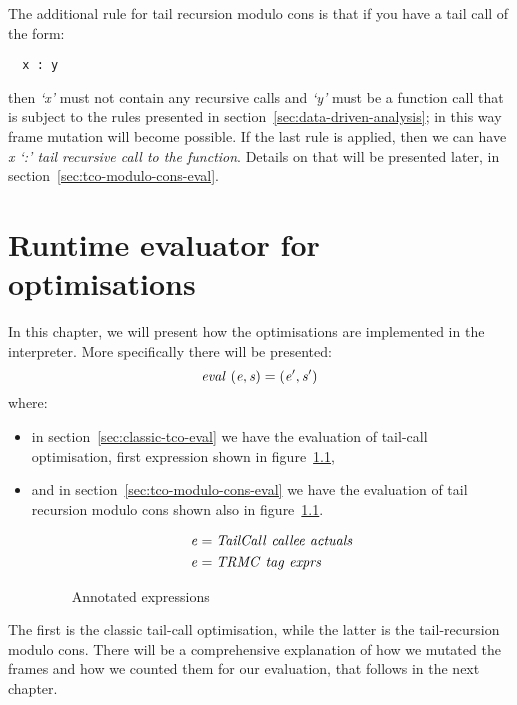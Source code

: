 \documentclass[diploma]{softlab-thesis}
\begin{document}
The additional rule for tail recursion modulo cons is that if you have a tail call of the form:
\begin{verbatim}
  x : y
\end{verbatim}
then \textit{`x'} must not contain any recursive calls and \textit{`y'} must be a function call that is subject to the 
rules presented in section~\ref{sec:data-driven-analysis}; in this way frame mutation will become possible. If the last rule is applied, 
then we can have \textit{x `:' tail recursive call to the function}. Details on that will be presented later, in section~\ref{sec:tco-modulo-cons-eval}.



\chapter {Runtime evaluator for optimisations}
\label{ch:evaluator}

In this chapter, we will present how the optimisations are implemented in the interpreter.
More specifically there will be presented:
\[ \mathit{eval \hfill\ (e, s) = (e', s')} \]
where:
\begin{itemize}
\item in section~\ref{sec:classic-tco-eval} we have the evaluation of tail-call optimisation, first expression 
      shown in figure~\ref{fig:annos},
\item and in section~\ref{sec:tco-modulo-cons-eval} we have the evaluation of tail recursion modulo cons shown
      also in figure~\ref{fig:annos}.
\begin{figure}[h]
  \begin{align*}
    & \mathit{e = TailCall \hfill\ callee \hfill\ actuals} \\
    & \mathit{e = TRMC \hfill\ tag \hfill\ exprs} 
  \end{align*}
\caption{Annotated expressions\label{fig:annos}}
\end{figure}

\end{itemize}
The first is the classic tail-call optimisation, while the latter is the tail-recursion 
modulo cons. There will be a comprehensive explanation of how we mutated the frames and how we counted them for 
our evaluation, that follows in the next chapter.
\end{document}
